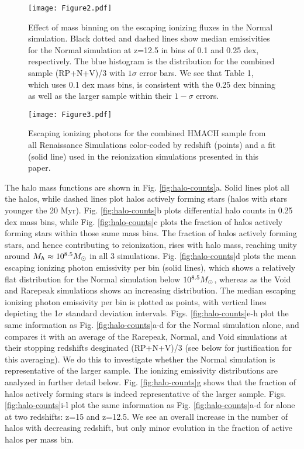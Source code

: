 \documentclass[iop,apj]{emulateapj}
\begin{document}
\begin{figure}
\texttt{[image: Figure2.pdf]}
\caption{Effect of mass binning on the escaping ionizing fluxes in the Normal simulation. Black dotted and dashed lines show median emissivities for the Normal simulation at z=12.5 in bins of 0.1 and 0.25 dex, respectively. The blue histogram is the distribution for the combined sample (RP+N+V)/3 with $1\sigma$ error bars. We see that Table 1, which uses 0.1 dex mass bins, is consistent with the 0.25 dex binning as well as the larger sample within their $1-\sigma$ errors.} 
\label{fig:nion-compare}
\end{figure}

\begin{figure}
\texttt{[image: Figure3.pdf]}
\caption{Escaping ionizing photons for the combined HMACH sample from all Renaissance Simulations color-coded by redshift (points) and a fit (solid line) used in the reionization simulations presented in this paper.}
\label{fig:hmach_fit}
\end{figure}


The halo mass functions are shown in Fig. \ref{fig:halo-counts}a. Solid lines plot all the halos, while dashed lines plot halos actively forming stars (halos with stars younger the 20 Myr).  Fig. \ref{fig:halo-counts}b plots differential halo counts in 0.25 dex mass bins, while Fig. \ref{fig:halo-counts}c plots the fraction of halos actively forming stars within those same mass bins. The fraction of halos actively forming stars, and hence contributing to reionization, rises with halo mass, reaching unity around  $\mh \approx 10^{8.5} \Ms$ in all 3 simulations.  Fig. \ref{fig:halo-counts}d plots the mean escaping ionizing photon emissivity per bin (solid lines), which shows a relatively flat distribution for the Normal simulation below $10^{8.5} \Ms$, whereas as the Void and Rarepeak simulations shows an increasing distribution. The median escaping ionizing photon emissivity per bin is plotted as points, with vertical lines depicting the 1$\sigma$ standard deviation intervals. Figs. \ref{fig:halo-counts}e-h plot the same information as  Fig. \ref{fig:halo-counts}a-d for the Normal simulation alone, and compares it with an average of the Rarepeak, Normal, and Void simulations at their stopping redshifts desginated (RP+N+V)/3 (see below for justification for this averaging). We do this to investigate whether the Normal simulation is representative of the larger sample. The ionizing emissivity distributions are analyzed in further detail below. Fig. \ref{fig:halo-counts}g shows that the fraction of halos actively forming stars is indeed representative of the larger sample. Figs. \ref{fig:halo-counts}i-l plot the same information as  Fig. \ref{fig:halo-counts}a-d for alone at two redshifts: z=15 and z=12.5. We see an overall increase in the number of halos with decreasing redshift, but only minor evolution in the fraction of active halos per mass bin. 
\end{document}
